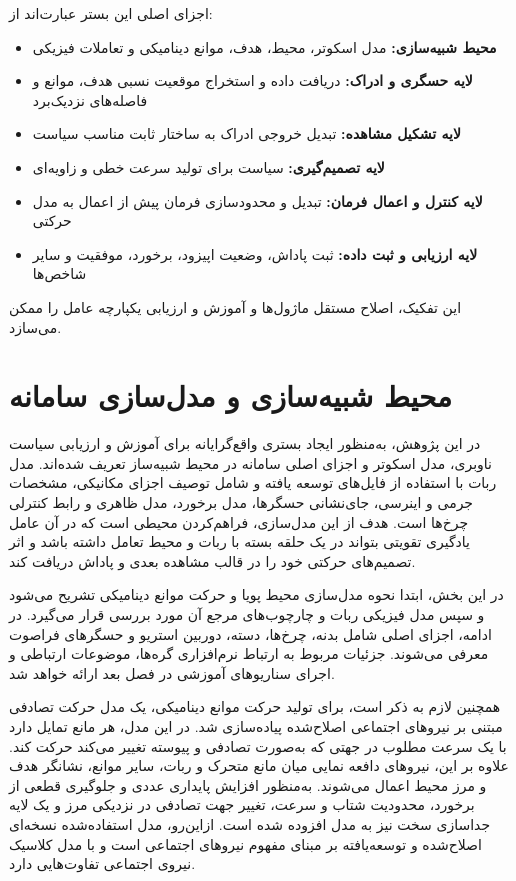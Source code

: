 اجزای اصلی این بستر عبارت‌اند از:
\begin{itemize}
	\item \textbf{محیط شبیه‌سازی:} مدل اسکوتر، محیط، هدف، موانع دینامیکی و تعاملات فیزیکی
	\item \textbf{لایه حسگری و ادراک:} دریافت داده و استخراج موقعیت نسبی هدف، موانع و فاصله‌های نزدیک‌برد
	\item \textbf{لایه تشکیل مشاهده:} تبدیل خروجی ادراک به ساختار ثابت مناسب سیاست
	\item \textbf{لایه تصمیم‌گیری:} سیاست  برای تولید سرعت خطی و زاویه‌ای
	\item \textbf{لایه کنترل و اعمال فرمان:} تبدیل و محدودسازی فرمان پیش از اعمال به مدل حرکتی
	\item \textbf{لایه ارزیابی و ثبت داده:} ثبت پاداش، وضعیت اپیزود، برخورد، موفقیت و سایر شاخص‌ها
\end{itemize}
این تفکیک، اصلاح مستقل ماژول‌ها و آموزش و ارزیابی یکپارچه عامل را ممکن می‌سازد.


\section{محیط شبیه‌سازی و مدل‌سازی سامانه}
\label{sec:simulation_environment_modeling}

در این پژوهش، به‌منظور ایجاد بستری واقع‌گرایانه برای آموزش و ارزیابی سیاست ناوبری، مدل اسکوتر و اجزای اصلی سامانه در محیط شبیه‌ساز  تعریف شده‌اند. مدل ربات با استفاده از فایل‌های  توسعه یافته و شامل توصیف اجزای مکانیکی، مشخصات جرمی و اینرسی، جای‌نشانی حسگرها، مدل برخورد، مدل ظاهری و رابط کنترلی چرخ‌ها است. هدف از این مدل‌سازی، فراهم‌کردن محیطی است که در آن عامل یادگیری تقویتی بتواند در یک حلقه بسته با ربات و محیط تعامل داشته باشد و اثر تصمیم‌های حرکتی خود را در قالب مشاهده بعدی و پاداش دریافت کند.

در این بخش، ابتدا نحوه مدل‌سازی محیط پویا و حرکت موانع دینامیکی تشریح می‌شود و سپس مدل فیزیکی ربات و چارچوب‌های مرجع آن مورد بررسی قرار می‌گیرد. در ادامه، اجزای اصلی شامل بدنه، چرخ‌ها، دسته، دوربین استریو و حسگرهای فراصوت معرفی می‌شوند. جزئیات مربوط به ارتباط نرم‌افزاری گره‌ها، موضوعات ارتباطی و اجرای سناریوهای آموزشی در فصل بعد ارائه خواهد شد.

همچنین لازم به ذکر است، برای تولید حرکت موانع دینامیکی، یک مدل حرکت تصادفی مبتنی بر نیروهای اجتماعی اصلاح‌شده پیاده‌سازی شد. در این مدل، هر مانع تمایل دارد با یک سرعت مطلوب در جهتی که به‌صورت تصادفی و پیوسته تغییر می‌کند حرکت کند. علاوه بر این، نیروهای دافعه نمایی میان مانع متحرک و ربات، سایر موانع، نشانگر هدف و مرز محیط اعمال می‌شوند. به‌منظور افزایش پایداری عددی و جلوگیری قطعی از برخورد، محدودیت شتاب و سرعت، تغییر جهت تصادفی در نزدیکی مرز و یک لایه جداسازی سخت نیز به مدل افزوده شده است. ازاین‌رو، مدل استفاده‌شده نسخه‌ای اصلاح‌شده و توسعه‌یافته بر مبنای مفهوم نیروهای اجتماعی است و با مدل کلاسیک نیروی اجتماعی تفاوت‌هایی دارد.


